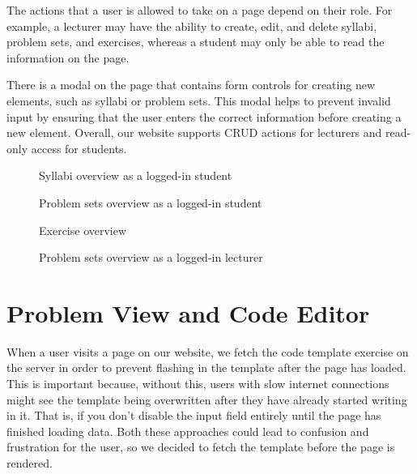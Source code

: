 The actions that a user is allowed to take on a page depend on their role. For example, a lecturer may have the ability to create, edit, and delete syllabi, problem sets, and exercises, whereas a student may only be able to read the information on the page.

There is a modal on the page that contains form controls for creating new elements, such as syllabi or problem sets.
This modal helps to prevent invalid input by ensuring that the user enters the correct information before creating a new element.
Overall, our website supports CRUD actions for lecturers and read-only access for students.

\begin{figure}[H]
    \centering
    \caption{Syllabi overview as a logged-in student}
    \label{fig:syllabi}
\end{figure}

\begin{figure}[H]
    \centering
    \caption{Problem sets overview as a logged-in student}
    \label{fig:problemsets}
\end{figure}

\begin{figure}[H]
    \centering
    \caption{Exercise overview}
    \label{fig:exercise_overview}
\end{figure}

\begin{figure}[H]
    \centering
    \caption{Problem sets overview as a logged-in lecturer}
    \label{fig:problemsets_teacher_view}
\end{figure}

\section{Problem View and Code Editor}
When a user visits a page on our website, we fetch the code template exercise on the server in order to prevent flashing in the template after the page has loaded.
This is important because, without this, users with slow internet connections might see the template being overwritten after they have already started writing in it. That is, if you don't disable the input field entirely until the page has finished loading data. Both these approaches could lead to confusion and frustration for the user, so we decided to fetch the template before the page is rendered.

